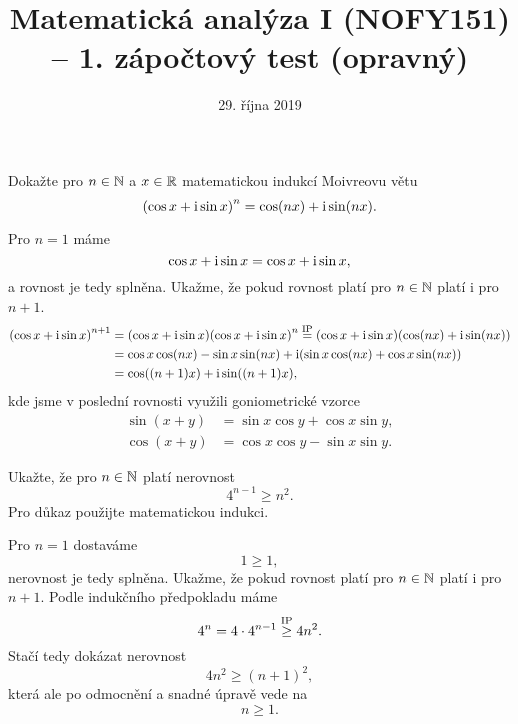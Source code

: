 \documentclass[answers]{exam}
\title{\vspace{-3ex}Matematická analýza I (NOFY151) – 1. zápočtový test (opravný)\vspace{-1ex}}
\author{\vspace{-2ex}}
\date{\vspace{-2ex}29. října 2019}
\begin{document}
\maketitle

\begin{questions}
  \question[2] Dokažte pro $n \in \mathbb{N}$ a $x \in \mathbb{R}$ matematickou indukcí Moivreovu větu
  \begin{equation*}
    \parens{\cos x + \iunit \sin x}^n
    =
    \cos (nx) + \iunit \sin (nx).
  \end{equation*}
  
  \begin{solution}
    Pro $n = 1$ máme
    \begin{equation*}
      \cos x + \mathrm{i} \sin x
      =
      \cos x + \mathrm{i} \sin x,
    \end{equation*}
    a rovnost je tedy splněna. Ukažme, že pokud rovnost platí pro $n \in \mathbb{N}$ platí i pro $n + 1$. 
    \begin{align*}
      \parens{\cos x + \iunit \sin x}^{n + 1}
      &=
      \parens{\cos x + \iunit \sin x} \parens{\cos x + \iunit \sin x}^n
      \texteq{IP}
      \parens{\cos x + \iunit \sin x}
      \parens{\cos (nx) + \iunit \sin (nx)}
      \\
      &=
      \cos x \cos (nx) - \sin x \sin (nx)
      +
      \iunit
      \parens{ \sin x \cos (nx) + \cos x \sin (nx) }
      \\
      &=
      \cos \parens{(n + 1) x} + \iunit \sin \parens{(n + 1) x},
    \end{align*}
    kde jsme v poslední rovnosti využili goniometrické vzorce
    \begin{align*}
      \sin (x + y) &= \sin x \cos y + \cos x \sin y,
      \\
      \cos (x + y) &= \cos x \cos y - \sin x \sin y.
    \end{align*}
    
  \end{solution}
  
  \question[2] Ukažte, že pro $n \in \mathbb{N}$ platí nerovnost
  \begin{equation*}
    4^{n - 1}
    \ge
    n^2.
  \end{equation*}
  Pro důkaz použijte matematickou indukci.
  
  \begin{solution}
    Pro $n = 1$ dostaváme
    \begin{equation*}
      1 \ge 1,
    \end{equation*}
    nerovnost je tedy splněna. Ukažme, že pokud rovnost platí pro $n \in \mathbb{N}$ platí i pro $n + 1$. Podle indukčního předpokladu máme
    \begin{equation*}
      4^n = 4 \cdot 4^{n - 1} \stackrel{\text{IP}}{\ge} 4n^2.
    \end{equation*}
    Stačí tedy dokázat nerovnost
    \begin{equation*}
      4 n^2
      \ge
      (n + 1)^2,
    \end{equation*}
    která ale po odmocnění a snadné úpravě vede na
    \begin{equation*}
      n \ge 1.
    \end{equation*}
   

\end{solution}
\end{questions}
\end{document}
